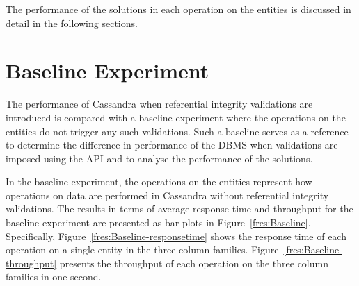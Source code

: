 
The performance of the solutions in each
operation on the entities is discussed in detail in the following sections.
 

\section{Baseline Experiment} \label{s:results-Baseline}

The performance of Cassandra when referential
integrity validations are introduced  is compared with
 a baseline experiment where the operations on the entities do not trigger any
such validations. Such a baseline serves as a reference to determine the
difference in performance of the \ac{DBMS} when validations are imposed using
the \ac{API} and to analyse the performance of the solutions.

In the baseline experiment, the operations on the entities represent how
operations on data are performed in Cassandra without referential integrity
validations.
The results in terms of average response time and throughput for the baseline
experiment are presented as  bar-plots in Figure~\ref{fres:Baseline}.
Specifically, Figure~\ref{fres:Baseline-responsetime} shows the response time 
of each operation on a single entity in the three column families.
Figure~\ref{fres:Baseline-throughput} presents the throughput of each operation
on the three column families in one second.

	
